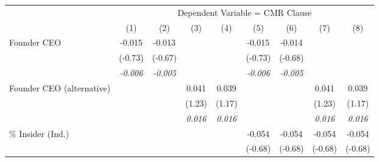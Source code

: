 {
\def\sym#1{\ifmmode^{#1}\else\(^{#1}\)\fi}
\begin{tabular}{l*{8}{c}}
\toprule
                    &\multicolumn{8}{c}{Dependent Variable = CMR Clause}                                                                                                                            \\\cmidrule(lr){2-9}
                    &\multicolumn{1}{c}{(1)}         &\multicolumn{1}{c}{(2)}         &\multicolumn{1}{c}{(3)}         &\multicolumn{1}{c}{(4)}         &\multicolumn{1}{c}{(5)}         &\multicolumn{1}{c}{(6)}         &\multicolumn{1}{c}{(7)}         &\multicolumn{1}{c}{(8)}         \\

\midrule Founder CEO  &      -0.015         &      -0.013         &                     &                     &      -0.015         &      -0.014         &                     &                     \\
                    &     (-0.73)         &     (-0.67)         &                     &                     &     (-0.73)         &     (-0.68)         &                     &                     \\
                    &\textit{-0.006}         &\textit{-0.005}         &                     &                     &\textit{-0.006}         &\textit{-0.005}         &                     &                     \\
Founder CEO (alternative)&                     &                     &       0.041         &       0.039         &                     &                     &       0.041         &       0.039         \\
                    &                     &                     &      (1.23)         &      (1.17)         &                     &                     &      (1.23)         &      (1.17)         \\
                    &                     &                     &\textit{0.016}         &\textit{0.016}         &                     &                     &\textit{0.016}         &\textit{0.016}         \\
\% Insider (Ind.)   &                     &                     &                     &                     &      -0.054         &      -0.054         &      -0.054         &      -0.054         \\
                    &                     &                     &                     &                     &     (-0.68)         &     (-0.68)         &     (-0.68)         &     (-0.68)         \\

\end{tabular}}
